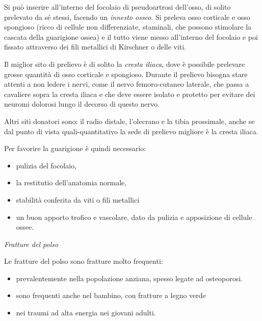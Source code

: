\documentclass[]{article}
\begin{document}
Si può inserire all'interno del focolaio di pseudoartrosi dell'osso, di
solito prelevato da sé stessi, facendo un \emph{innesto osseo}. Si
preleva osso corticale e osso spongioso (ricco di cellule non
differenziate, staminali, che possono stimolare la cascata della
guarigione ossea) e il tutto viene messo all'interno del focolaio e poi
fissato attraverso dei fili metallici di Kirschner o delle viti.

Il miglior sito di prelievo è di solito la \emph{cresta iliaca}, dove è
possibile prelevare grosse quantità di osso corticale e spongioso.
Durante il prelievo bisogna stare attenti a non ledere i nervi, come il
nervo femoro-cutaneo laterale, che passa a cavaliere sopra la cresta
iliaca e che deve essere isolato e protetto per evitare dei neuromi
dolorosi lungo il decorso di questo nervo.

Altri siti donatori sono: il radio distale, l'olecrano e la tibia
prossimale, anche se dal punto di vista quali-quantitativo la sede di
prelievo migliore è la cresta iliaca.

Per favorire la guarigione è quindi necessario:

\begin{itemize}
\item
  pulizia del focolaio,
\end{itemize}

\begin{itemize}
\item
  la restitutio dell'anatomia normale,
\item
  stabilità conferita da viti o fili metallici
\item
  un buon apporto trofico e vascolare, dato da pulizia e apposizione di
  cellule ossee.
\end{itemize}

\emph{Fratture del polso}

Le fratture del polso sono fratture molto frequenti:

\begin{itemize}
\item
  prevalentemente nella popolazione anziana, spesso legate ad
  osteoporosi.
\end{itemize}

\begin{itemize}
\item
  sono frequenti anche nel bambino, con fratture a legno verde
\item
  nei traumi ad alta energia nei giovani adulti.
\end{itemize}
\end{document}
